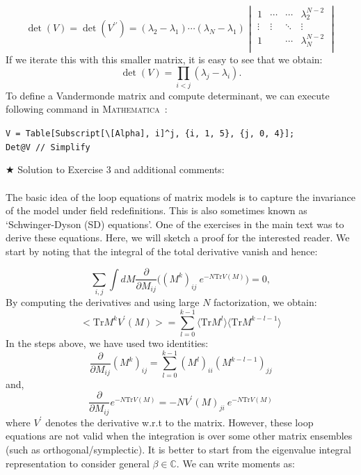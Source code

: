 \documentclass[letter,11pt]{article}
\newcommand{\MA}{\textsc{Mathematica}}
\begin{document}
\begin{equation}
	\det(V) = \det(V^{\prime\prime}) = 
	(\lambda_2 - \lambda_1) \cdots (\lambda_N - \lambda_1)
	\begin{vmatrix}
		1 & \cdots & \cdots & \lambda_2^{N-2} \\ 
		\vdots  & \vdots  & \ddots & \vdots  \\
		1 &  & \cdots &  \lambda_N^{N-2} \\
	\end{vmatrix}
\end{equation}
If we iterate this with this smaller matrix, it is easy to see that we obtain:
\begin{equation}
	\det(V) = \prod_{i<j} (\lambda_j - \lambda_i).
\end{equation}
To define a Vandermonde matrix and compute determinant, we can execute following command in \MA~:
\begin{mdframed}[backgroundcolor=magenta!2]
	\begin{footnotesize} 
		\verb"V = Table[Subscript[\[Alpha], i]^j, {i, 1, 5}, {j, 0, 4}];"\\ 
		\verb"Det@V // Simplify"
	\end{footnotesize} 
\end{mdframed}

\noindent $\bigstar$ Solution to Exercise 3 and additional comments: 
\\ \\ 
The basic idea of the loop equations of matrix models is to capture the invariance of the model under field redefinitions. This is also sometimes known as `Schwinger-Dyson (SD) equations'. One of the exercises in the main text was to derive these equations. Here, we will sketch a proof for the interested reader. We start by noting that the integral of the total derivative vanish and hence:

\begin{equation}
	\sum_{i,j} \int dM \frac{\partial}{\partial M_{ij}} \Bigg( (M^k)_{ij}~e^{-N\mathrm{Tr} V(M)}\Bigg) = 0, 
\end{equation}
By computing the derivatives and using large $N$ factorization, we obtain:
\begin{equation}
	\Big< \mathrm{Tr} M^{k} V^{\prime}(M) \Big> = \sum_{l=0}^{k-1} \langle \mathrm{Tr} M^{l} \rangle  \langle \mathrm{Tr} M^{k-l-1} \rangle
\end{equation}
In the steps above, we have used two identities:
\begin{equation}
	\frac{\partial}{\partial M_{ij}} (M^{k})_{ij} = \sum_{l=0}^{k-1} (M^{l})_{ii} (M^{k-l-1})_{jj}
\end{equation}
and, 
\begin{equation}
	\frac{\partial}{\partial M_{ij}} e^{-N\mathrm{Tr} V(M)} = -N V^{\prime}(M)_{ji}~e^{-N\mathrm{Tr} V(M)}
\end{equation}
where $V^{\prime}$ denotes the derivative w.r.t to the matrix. 
However, these loop equations are not valid when the integration is over some other matrix ensembles (such as orthogonal/symplectic). It is better to start from the eigenvalue integral representation to consider general $\beta \in \mathbb{C}$. We can write moments as:
\end{document}
